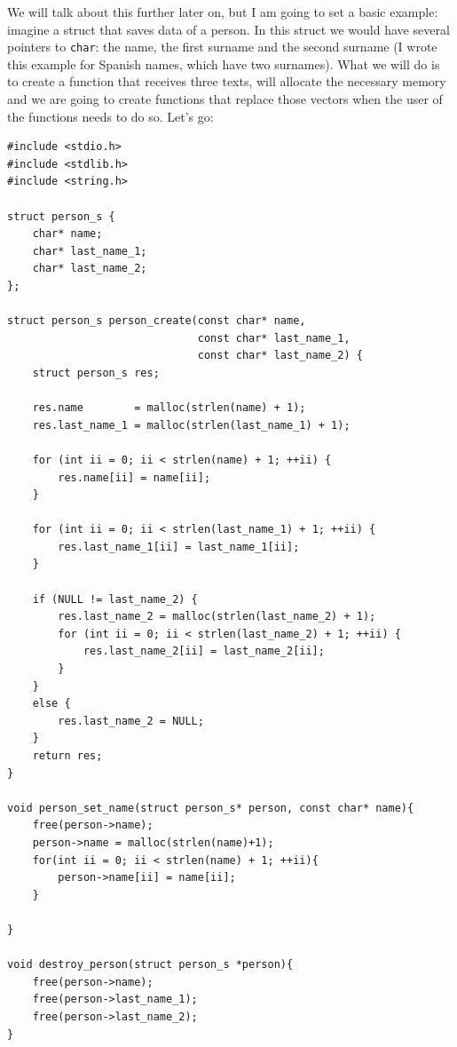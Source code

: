 \documentclass[a4paper]{article}
\begin{document}
We will talk about this further later on, but I am going to set a basic example:
imagine a struct that saves data of a person. In this struct we would have
several pointers to \verb!char!: the name, the first surname and the second
surname (I wrote this example for Spanish names, which have two surnames). What
we will do is to create a function that receives three texts, will allocate the
necessary memory and we are going to create functions that replace those vectors
when the user of the functions needs to do so. Let's go:

\noindent
\begin{minipage}[H]{\linewidth}
\mbox{}
\begin{lstlisting}[style=C,
caption={Struct with const pointers -- Managing functions},
label={lst:structConstPointers}]
#include <stdio.h>
#include <stdlib.h>
#include <string.h>

struct person_s {
    char* name;
    char* last_name_1;
    char* last_name_2;
};

struct person_s person_create(const char* name,
                              const char* last_name_1,
                              const char* last_name_2) {
    struct person_s res;

    res.name        = malloc(strlen(name) + 1);
    res.last_name_1 = malloc(strlen(last_name_1) + 1);

    for (int ii = 0; ii < strlen(name) + 1; ++ii) {
        res.name[ii] = name[ii];
    }

    for (int ii = 0; ii < strlen(last_name_1) + 1; ++ii) {
        res.last_name_1[ii] = last_name_1[ii];
    }

    if (NULL != last_name_2) {
        res.last_name_2 = malloc(strlen(last_name_2) + 1);
        for (int ii = 0; ii < strlen(last_name_2) + 1; ++ii) {
            res.last_name_2[ii] = last_name_2[ii];
        }
    }
    else {
        res.last_name_2 = NULL;
    }
    return res;
}

void person_set_name(struct person_s* person, const char* name){
    free(person->name);
    person->name = malloc(strlen(name)+1);
    for(int ii = 0; ii < strlen(name) + 1; ++ii){
        person->name[ii] = name[ii];
    }

}

void destroy_person(struct person_s *person){
    free(person->name);
    free(person->last_name_1);
    free(person->last_name_2);
}
\end{lstlisting}
\end{minipage}
\end{document}
